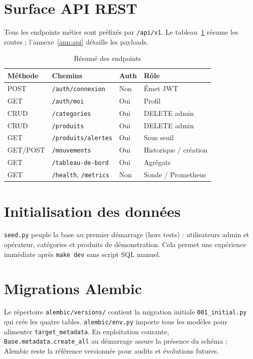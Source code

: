 \section{Surface API REST}

Tous les endpoints métier sont préfixés par \texttt{/api/v1}. Le tableau~\ref{tab:api-resume} résume les routes ; l'annexe~\ref{ann:api} détaille les payloads.

\begin{table}[htbp]
  \centering
  \caption{Résumé des endpoints}
  \label{tab:api-resume}
  \small
  \begin{tabular}{@{}lllp{4.8cm}@{}}
    \toprule
    \textbf{Méthode} & \textbf{Chemins} & \textbf{Auth} & \textbf{Rôle} \\
    \midrule
    POST & \texttt{/auth/connexion} & Non & Émet JWT \\
    GET & \texttt{/auth/moi} & Oui & Profil \\
    CRUD & \texttt{/categories} & Oui & DELETE admin \\
    CRUD & \texttt{/produits} & Oui & DELETE admin \\
    GET & \texttt{/produits/alertes} & Oui & Sous seuil \\
    GET/POST & \texttt{/mouvements} & Oui & Historique / création \\
    GET & \texttt{/tableau-de-bord} & Oui & Agrégats \\
    GET & \texttt{/health}, \texttt{/metrics} & Non & Sonde / Prometheus \\
    \bottomrule
  \end{tabular}
\end{table}

\section{Initialisation des données}

\texttt{seed.py} peuple la base au premier démarrage (hors tests) : utilisateurs admin et opérateur, catégories et produits de démonstration. Cela permet une expérience immédiate après \texttt{make dev} sans script SQL manuel.

\section{Migrations Alembic}

Le répertoire \texttt{alembic/versions/} contient la migration initiale \texttt{001\_initial.py} qui crée les quatre tables. \texttt{alembic/env.py} importe tous les modèles pour alimenter \texttt{target\_metadata}. En exploitation courante, \texttt{Base.metadata.create\_all} au démarrage assure la présence du schéma ; Alembic reste la référence versionnée pour audits et évolutions futures.

